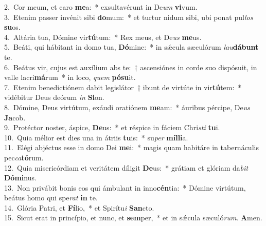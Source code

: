 {2.~}Cor meum, et caro \textbf{me}a:~* exsultavérunt in De\textit{um} \textbf{vi}vum.\\
{3.~}Etenim passer invénit sibi \textbf{do}mum:~* et turtur nidum sibi, ubi ponat pul\textit{los} \textbf{su}os.\\
{4.~}Altária tua, Dómine vir\textbf{tú}tum:~* Rex meus, et De\textit{us} \textbf{me}us.\\
{5.~}Beáti, qui hábitant in domo tua, \textbf{Dó}mine:~* in sǽcula sæculórum \textit{lau}\textbf{dá}\textbf{bunt} te.\\
{6.~}Beátus vir, cujus est auxílium abs te:~† ascensiónes in corde suo dispósuit, in valle lacri\textbf{má}rum~* in loco, \textit{quem} \textbf{pó}\textbf{su}it.\\
{7.~}Etenim benedictiónem dabit legislátor~† ibunt de virtúte in vir\textbf{tú}tem:~* vidébitur Deus deórum \textit{in} \textbf{Si}on.\\
{8.~}Dómine, Deus virtútum, exáudi oratiónem \textbf{me}am:~* áuribus pércipe, De\textit{us} \textbf{Ja}cob.\\
{9.~}Protéctor noster, áspice, \textbf{De}us:~* et réspice in fáciem Chri\textit{sti} \textbf{tu}i.\\
{10.~}Quia mélior est dies una in átriis \textbf{tu}is:~* su\textit{per} \textbf{míl}\textbf{li}a.\\
{11.~}Elégi abjéctus esse in domo Dei \textbf{me}i:~* magis quam habitáre in tabernáculis pec\textit{ca}\textbf{tó}rum.\\
{12.~}Quia misericórdiam et veritátem díligit \textbf{De}us:~* grátiam et glóriam da\textit{bit} \textbf{Dó}\textbf{mi}nus.\\
{13.~}Non privábit bonis eos qui ámbulant in inno\textbf{cén}tia:~* Dómine virtútum, beátus homo qui spe\textit{rat} \textbf{in} te.\\
{14.~}Glória Patri, et \textbf{Fí}lio,~* et Spirítu\textit{i} \textbf{San}cto.\\
{15.~}Sicut erat in princípio, et nunc, et \textbf{sem}per,~* et in sǽcula sæculó\textit{rum}. \textbf{A}men.\\
